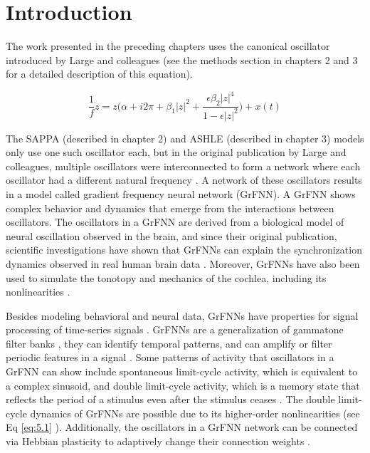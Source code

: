 \documentclass{report}
\begin{document}
\section{Introduction}

The work presented in the preceding chapters uses the canonical oscillator introduced by Large and colleagues \cite{large2010canonical} (see the methods section in chapters 2 and 3 for a detailed description of this equation).  

\begin{equation}
\frac{1}{f}\dot{z} = z\bigg(\alpha + i2\pi + \beta_1|z|^2 + \frac{\epsilon\beta_2|z|^4}{1-\epsilon|z|^2}\bigg) + x(t) \label{eq:5.1}
\end{equation}

The SAPPA (described in chapter 2) and ASHLE (described in chapter 3) models only use one such oscillator each, but in the original publication by Large and colleagues, multiple oscillators were interconnected to form a network where each oscillator had a different natural frequency \cite{large2010canonical}. A network of these oscillators results in a model called gradient frequency neural network (GrFNN). A GrFNN shows complex behavior and dynamics that emerge from the interactions between oscillators. The oscillators in a GrFNN are derived from a biological model of neural oscillation observed in the brain, and since their original publication, scientific investigations have shown that GrFNNs can explain the synchronization dynamics observed in real human brain data \cite{tal2017neural}. Moreover, GrFNNs have also been used to simulate the tonotopy and mechanics of the cochlea, including its nonlinearities \cite{lerud2019canonical}.

Besides modeling behavioral and neural data, GrFNNs have properties for signal processing of time-series signals \cite{kim2015signal}. GrFNNs are a generalization of gammatone filter banks \cite{large2015learning}, they can identify temporal patterns, and can amplify or filter periodic features in a signal \cite{kim2015signal}. Some patterns of activity that oscillators in a GrFNN can show include spontaneous limit-cycle activity, which is equivalent to a complex sinusoid, and double limit-cycle activity, which is a memory state that reflects the period of a stimulus even after the stimulus ceases \cite{kim2015signal}. The double limit-cycle dynamics of GrFNNs are possible due to its higher-order nonlinearities (see Eq \eqref{eq:5.1} \cite{large2010canonical, kim2015signal}). Additionally, the oscillators in a GrFNN network can be connected via Hebbian plasticity to adaptively change their connection weights \cite{lambert2016adaptive, kim2017dynamical}. 
\end{document}
